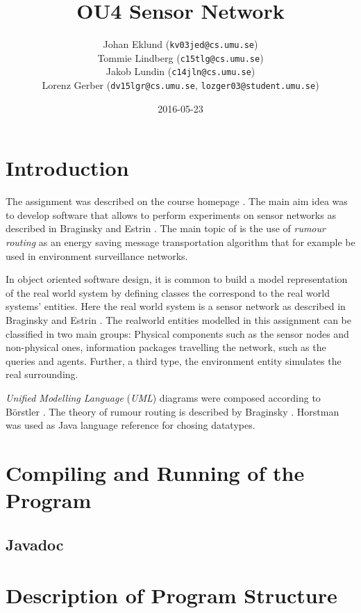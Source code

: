 \documentclass[a4paper,11pt,twoside]{article}
\title{OU4 Sensor Network}
\author{Johan Eklund ({\tt{kv03jed@cs.umu.se}}) \\ 
Tommie Lindberg ({\tt{c15tlg@cs.umu.se}}) \\
Jakob Lundin ({\tt{c14jln@cs.umu.se}}) \\
Lorenz Gerber ({\tt{dv15lgr@cs.umu.se}}, {\tt{lozger03@student.umu.se}})
}
\date{2016-05-23}
\begin{document}
\lstset{language=C}
\maketitle
\thispagestyle{empty}
\newpage
\tableofcontents
\thispagestyle{empty}
\newpage

\clearpage
{}

\section{Introduction} 
The assignment was described on the course homepage
\cite{sensornetwork}. The main aim idea was to develop software that
allows to perform experiments on sensor networks as described in
Braginsky and Estrin \cite{braginsky2002}. The main topic of
\cite{braginsky2002} is the use of \textit{rumour routing} as an
energy saving message transportation algorithm that for example
be used in environment surveillance networks.

In object oriented software design, it is common to build 
a model representation of the real world system \cite{roleplay} by
defining classes the correspond to the real world systems' entities.  
Here the real world system is a sensor network as described in
Braginsky and Estrin \cite{braginsky2002}. The realworld entities
modelled in this assignment can be classified in two main groups: Physical
components such as the sensor nodes and non-physical ones, information packages
travelling the network, such as the queries and agents. Further, a third type, 
the environment entity simulates the real surrounding.

\textit{Unified Modelling Language} (\textit{UML}) diagrams were
composed according to Börstler \cite{roleplay}. The theory of rumour
routing is described by Braginsky \cite{braginsky2002}. Horstman was
used as Java language reference \cite{horstman2014} for chosing datatypes.

\section{Compiling and Running of the Program}

\subsection{Javadoc}


\section{Description of Program Structure}
\end{document}
